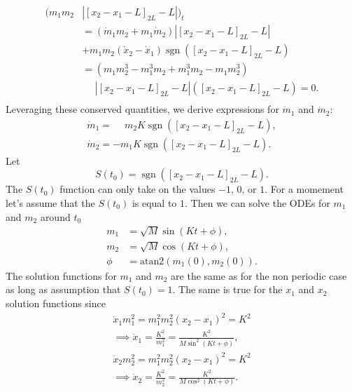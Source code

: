 \documentclass[english,master]{liumaiex}
\theoremstyle{plain}
\theoremstyle{definition}
\DeclareMathOperator{\sgn}{sgn}
\begin{document}
\begin{equation}
\begin{aligned}
	(m_1m_2&|[x_2 - x_1 - L]_{2L} - L|)_t \\
	&= (\dot{m}_1m_2 + m_1\dot{m}_2)|[x_2 - x_1 - L]_{2L} - L| \\
	&+ m_1m_2(\dot{x}_2 - \dot{x}_1)\sgn([x_2 - x_1 - L]_{2L} - L) \\
	&=(m_1m_2^3 - m_1^3m_2 + m_1^3m_2 - m_1m_2^3)\\
	&\phantom{=}|[x_2 - x_1 - L]_{2L} - L|([x_2 - x_1 - L]_{2L} - L) =0. \\
\end{aligned}
\end{equation}
%
Leveraging these conserved quantities, we derive expressions for $\dot{m}_1$ and $\dot{m}_2$:
\begin{equation}
\begin{aligned}
	\dot{m}_1 = \phantom{-}m_2K \sgn([x_2 - x_1 - L]_{2L} - L), \\
	\dot{m}_2 = -m_1K \sgn([x_2 - x_1 - L]_{2L} - L).
\end{aligned}
\end{equation}
%
Let
\begin{equation}
	S(t_0) = \sgn([x_2 - x_1 - L]_{2L} - L).
\end{equation}
The $S(t_0)$ function can only take on the values $-1$, $0$, or $1$. For a momement let's assume that the $S(t_0)$ is equal to $1$. Then we can solve the ODEs for $m_1$ and $m_2$ around $t_0$
\begin{equation}
\begin{aligned}
	m_1 &= \sqrt{M} \sin(K t + \phi), \\
	m_2 &= \sqrt{M} \cos(K t + \phi), \\
	\phi &= \text{atan2}(m_1(0),m_2(0)).
\end{aligned}
\end{equation}
The solution functions for $m_1$ and $m_2$ are the same as for the non periodic case as long as assumption that $S(t_0) = 1$. The same is true for the $x_1$ and $x_2$ solution functions since
\begin{align}
	\dot{x}_1m_1^2 = m_1^2m_2^2(x_2 - x_1)^2 = K^2 \\
	\implies
	\dot{x}_1 = \frac{K^2}{m_1^2} = \frac{K^2}{M\sin^2(Kt + \phi)}, \\
	\dot{x}_2m_2^2 = m_1^2m_2^2(x_2 - x_1)^2 = K^2 \\
	\implies
	\dot{x}_2 = \frac{K^2}{m_2^2} = \frac{K^2}{M\cos^2(Kt + \phi)}.
\end{align}
\end{document}

